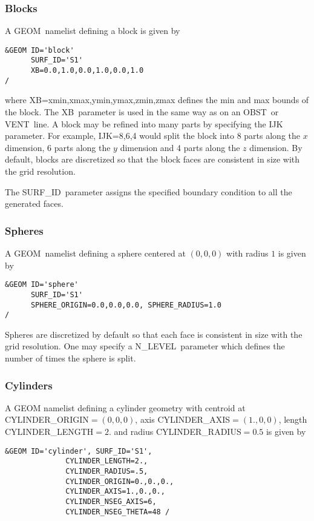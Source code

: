 \documentclass[12pt]{article}
\begin{document}
\subsubsection{Blocks}
A {\ct GEOM}\ namelist defining a block is given by

\begin{verbatim}
&GEOM ID='block'
      SURF_ID='S1'
      XB=0.0,1.0,0.0,1.0,0.0,1.0
/
\end{verbatim}

\noindent where {\ct XB=xmin,xmax,ymin,ymax,zmin,zmax} defines the min and max bounds of the block.
The {\ct XB}\ parameter is used in the same way as on an {\ct OBST}\ or {\ct VENT}\ line.
A block may be refined into many parts by specifying the {\ct IJK} parameter.
For example, {\ct IJK=8,6,4} would split the block into 8 parts along the $x$ dimension,
6 parts along the $y$ dimension and 4 parts along the $z$ dimension.
By default, blocks are discretized so that the block faces are consistent in size with the grid resolution.

The {\ct SURF\_ID}\ parameter assigns the specified boundary condition to all the generated faces.

\subsubsection{Spheres}
A {\ct GEOM}\ namelist defining a sphere centered at $(0,0,0)$ with radius $1$ is given by

\begin{verbatim}
&GEOM ID='sphere'
      SURF_ID='S1'
      SPHERE_ORIGIN=0.0,0.0,0.0, SPHERE_RADIUS=1.0
/
\end{verbatim}

\noindent Spheres are discretized by default so that each face is consistent in size with the grid resolution.
One may specify a {\ct N\_LEVEL}\ parameter which defines the number of times the sphere is split.


\subsubsection{Cylinders}


A {\ct GEOM} namelist defining a cylinder geometry with centroid at {\ct CYLINDER\_ORIGIN}$=(0,0,0)$, axis {\ct CYLINDER\_AXIS}$=(1.,0,0)$, length {\ct CYLINDER\_LENGTH}$=2.$ and radius {\ct CYLINDER\_RADIUS}$=0.5$ is given by

\begin{verbatim}
&GEOM ID='cylinder', SURF_ID='S1',
              CYLINDER_LENGTH=2.,
              CYLINDER_RADIUS=.5,
              CYLINDER_ORIGIN=0.,0.,0.,
              CYLINDER_AXIS=1.,0.,0.,
              CYLINDER_NSEG_AXIS=6,
              CYLINDER_NSEG_THETA=48 /
 \end{verbatim}
\end{document}
